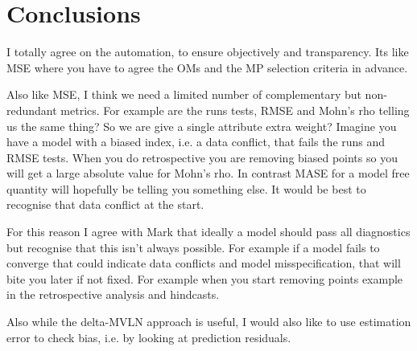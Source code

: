 \section{Conclusions}

I totally agree on the automation, to ensure objectively and transparency. Its like MSE where you have to agree the OMs and the MP selection criteria in advance.

Also like MSE, I think we need a limited number of complementary but non-redundant metrics. For example are the runs tests,  RMSE and Mohn's rho telling us the same thing? So we are give a single attribute extra weight? Imagine you have a model with a biased index, i.e. a data conflict, that fails the runs and RMSE tests. When you do retrospective you are removing biased points so you will get a large absolute value for Mohn's rho. In contrast MASE for a model free quantity will hopefully be telling you something else. It would be best to recognise that data conflict at the start.

For this reason I  agree with Mark that ideally a model should pass all diagnostics but recognise that this isn't always possible. For example if a model fails to converge that could indicate data conflicts and model misspecification, that will bite you later if not fixed. For example when you start removing points example in the retrospective analysis and hindcasts.

Also while the delta-MVLN approach is useful, I would also like to use estimation error to check bias, i.e. by looking at prediction residuals.

